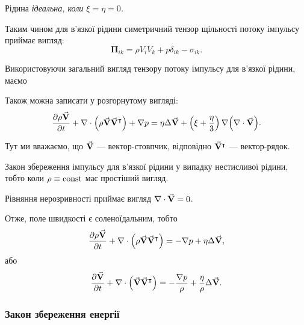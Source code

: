 \begin{remark}
	Рідина \it{ідеальна}, коли $\xi = \eta = 0$.
\end{remark}

Таким чином для в'язкої рідини симетричний тензор щільності потоку імпульсу приймає вигляд:
\begin{equation}
	\bm{\Pi}_{ik} = \rho V_i V_k + p \delta_{ik} - \sigma_{ik}.
\end{equation}

Використовуючи загальний вигляд тензору потоку імпульсу для в'язкої рідини, маємо
\begin{law}
	\label{law:impulse-conservation-viscous-liquid}
	Також можна записати у розгорнутому вигляді:
	\begin{equation}
		\label{eq:impulse-conservation-viscous-liquid}
		\frac{\partial \rho {\vec{\mathbf{V}}}}{\partial t} + \nabla \cdot \Big(\rho {\vec{\mathbf{V}}} {\vec{\mathbf{V}}}^\intercal\Big) + \nabla p = \eta \Delta {\vec{\mathbf{V}}} + \left( \xi + \frac{\eta}{3} \right) \nabla \Big(\nabla \cdot {\vec{\mathbf{V}}} \Big).
	\end{equation}
\end{law}

\begin{remark}
	Тут ми вважаємо, що ${\vec{\mathbf{V}}}$ --- вектор-стовпчик, відповідно   ${\vec{\mathbf{V}}}^\intercal $ --- вектор-рядок.
\end{remark}

\begin{remark}
	Закон збереження імпульсу для в'язкої рідини у випадку нестисливої рідини, тобто коли $\rho \equiv \operatorname{const}$ має простіший вигляд.
\end{remark}
	
Рівняння нерозривності приймає вигляд $\nabla \cdot {\vec{\mathbf{V}}} = 0$. \medskip

Отже, поле швидкості є соленоїдальним, тобто
\begin{equation}
	\frac{\partial \rho {\vec{\mathbf{V}}}}{\partial t} + \nabla \cdot \Big(\rho {\vec{\mathbf{V}}} {\vec{\mathbf{V}}}^\intercal\Big) = - \nabla p + \eta \Delta {\vec{\mathbf{V}}},
\end{equation}
або
\begin{equation}
	\frac{\partial {\vec{\mathbf{V}}}}{\partial t} + \nabla \cdot \Big({\vec{\mathbf{V}}} {\vec{\mathbf{V}}}^\intercal\Big) = - \frac{\nabla p}{\rho} + \frac{\eta}{\rho} \Delta {\vec{\mathbf{V}}}.
\end{equation}

\subsubsection{Закон збереження енергії}

